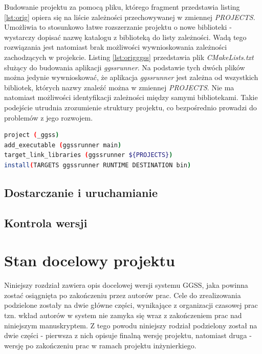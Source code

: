 Budowanie projektu za pomocą pliku, którego fragment przedstawia listing \ref{lst:orig} opiera się na liście zależności przechowywanej w zmiennej \textit{PROJECTS}. Umożliwia to stosunkowo łatwe rozszerzanie projektu o nowe biblioteki - wystarczy dopisać nazwę katalogu z biblioteką do listy zależności. Wadą tego rozwiązania jest natomiast brak możliwości wywnioskowania zależności zachodzących w projekcie. Listing \ref{lst:origggss} przedstawia plik \textit{CMakeLists.txt} służący do budowania aplikacji \textit{ggssrunner}. Na podstawie tych dwóch plików można jedynie wywnioskować, że aplikacja \textit{ggssrunner} jest zależna od wszystkich bibliotek, których nazwy znaleźć można w zmiennej \textit{PROJECTS}. Nie ma natomiast możliwości identyfikacji zależności między samymi bibliotekami. Takie podejście utrudnia zrozumienie struktury projektu, co bezpośrednio prowadzi do problemów z jego rozwojem.

\begin{lstlisting}[language=bash, caption={Oryginalny plik CMakeLists.txt służacy budowania aplikacji ggssrunner.}, label={lst:origggss}]
project (_ggss)
add_executable (ggssrunner main)
target_link_libraries (ggssrunner ${PROJECTS})
install(TARGETS ggssrunner RUNTIME DESTINATION bin)
\end{lstlisting}




\section{Dostarczanie i uruchamianie}

\section{Kontrola wersji}



\chapter{Stan docelowy projektu}
\label{cha:docel}
Niniejszy rozdział zawiera opis docelowej wersji systemu GGSS, jaka powinna zostać osiągnięta po zakończeniu przez autorów prac. Cele do zrealizowania podzielone zostały na dwie główne części, wynikające z organizacji czasowej prac tzn. wkład autorów w system nie zamyka się wraz z zakończeniem prac nad niniejszym manuskryptem. Z tego powodu niniejszy rodział podzielony został na dwie części - pierwsza z nich opisuje finalną wersję projektu, natomiast druga - wersję po zakończeniu prac w ramach projektu inżynierkiego.

